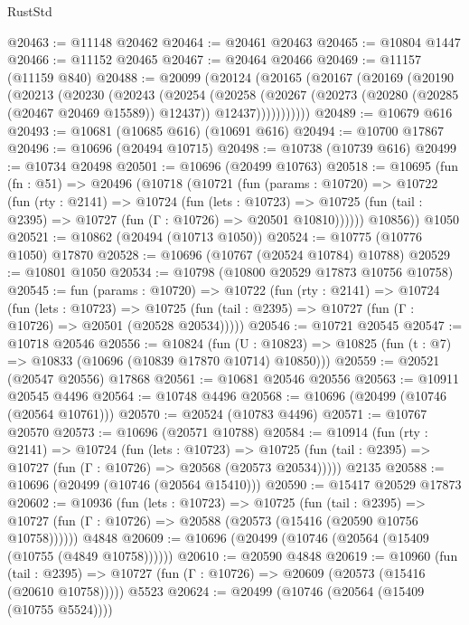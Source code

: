 \begin{lexlean}{RustStd}
\begin{coremodule}
@20463 := @11148 @20462
@20464 := @20461 @20463
@20465 := @10804 @1447
@20466 := @11152 @20465
@20467 := @20464 @20466
@20469 := @11157 (@11159 @840)
@20488 := @20099
    (@20124
      (@20165
        (@20167
          (@20169
            (@20190
              (@20213
                (@20230
                  (@20243
                    (@20254
                      (@20258
                        (@20267
                          (@20273 (@20280 (@20285 (@20467 @20469 @15589)) @12437))
                          @12437)))))))))))
@20489 := @10679 @616
@20493 := @10681 (@10685 @616) (@10691 @616)
@20494 := @10700 @17867
@20496 := @10696 (@20494 @10715)
@20498 := @10738 (@10739 @616)
@20499 := @10734 @20498
@20501 := @10696 (@20499 @10763)
@20518 := @10695
    (fun (fn : @51) =>
    @20496
      (@10718
        (@10721
          (fun (params : @10720) =>
          @10722
            (fun (rty : @2141) =>
            @10724
              (fun (lets : @10723) =>
              @10725 (fun (tail : @2395) => @10727 (fun (Γ : @10726) => @20501 @10810))))))
        @10856))
    @1050
@20521 := @10862 (@20494 (@10713 @1050))
@20524 := @10775 (@10776 @1050) @17870
@20528 := @10696 (@10767 (@20524 @10784) @10788)
@20529 := @10801 @1050
@20534 := @10798 (@10800 @20529 @17873 @10756 @10758)
@20545 := fun (params : @10720) =>
  @10722
    (fun (rty : @2141) =>
    @10724
      (fun (lets : @10723) =>
      @10725 (fun (tail : @2395) => @10727 (fun (Γ : @10726) => @20501 (@20528 @20534)))))
@20546 := @10721 @20545
@20547 := @10718 @20546
@20556 := @10824
    (fun (U : @10823) => @10825 (fun (t : @7) => @10833 (@10696 (@10839 @17870 @10714) @10850)))
@20559 := @20521 (@20547 @20556) @17868
@20561 := @10681 @20546 @20556
@20563 := @10911 @20545 @4496
@20564 := @10748 @4496
@20568 := @10696 (@20499 (@10746 (@20564 @10761)))
@20570 := @20524 (@10783 @4496)
@20571 := @10767 @20570
@20573 := @10696 (@20571 @10788)
@20584 := @10914
    (fun (rty : @2141) =>
    @10724
      (fun (lets : @10723) =>
      @10725 (fun (tail : @2395) => @10727 (fun (Γ : @10726) => @20568 (@20573 @20534)))))
    @2135
@20588 := @10696 (@20499 (@10746 (@20564 @15410)))
@20590 := @15417 @20529 @17873
@20602 := @10936
    (fun (lets : @10723) =>
    @10725
      (fun (tail : @2395) =>
      @10727 (fun (Γ : @10726) => @20588 (@20573 (@15416 (@20590 @10756 @10758))))))
    @4848
@20609 := @10696 (@20499 (@10746 (@20564 (@15409 (@10755 (@4849 @10758))))))
@20610 := @20590 @4848
@20619 := @10960
    (fun (tail : @2395) => @10727 (fun (Γ : @10726) => @20609 (@20573 (@15416 (@20610 @10758)))))
    @5523
@20624 := @20499 (@10746 (@20564 (@15409 (@10755 @5524))))

\end{coremodule}
\end{lexlean}
